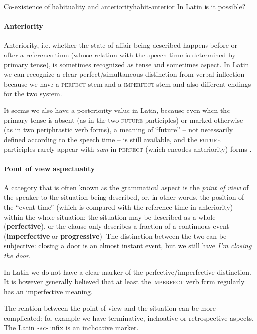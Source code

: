\documentclass[a4paper, oneside, 12pt]{report}
\newcommand*{\citetable}[1]{Table~{#1}}
\newcommand*{\concept}[1]{\textbf{#1}}
\newcommand{\form}[1]{\emph{#1}}
\newcommand*{\category}[1]{\textsc{#1}}
\begin{document}
\begin{todobox}{Co-existence of habituality and anteriority}{habit-anterior}
In Latin is it possible?
\end{todobox}

\paragraph*{Anteriority}
Anteriority, i.e. whether the state of affair being described
happens before or after a reference time 
(whose relation with the speech time is determined by primary tense),
is sometimes recognized as tense and sometimes aspect.
In Latin we can recognize a clear perfect/simultaneous distinction from verbal inflection
because we have a \category{perfect} stem and a \category{imperfect} stem
and also different endings for the two system.

It seems we also have a posteriority value in Latin,
because even when the primary tense is absent 
(as in the two \category{future} participles)
or marked otherwise (as in two periphrastic verb forms),
a meaning of ``future'' -- not necessarily defined according to the speech time --
is still available,
and the \category{future} participles rarely appear
with \form{sum} in \category{perfect} (which encodes anteriority) forms
\citep[\citetable{7.3}]{Pinkster1}.

\paragraph*{Point of view aspectuality}
A category that is often known as the grammatical aspect 
is the \emph{point of view} of the speaker to the situation being described,
or, in other words, the position of the ``event time'' 
(which is compared with the reference time in anteriority)
within the whole situation:
the situation may be described as a whole (\concept{perfective}),
or the clause only describes a fraction of a continuous event 
(\concept{imperfective} or \concept{progressive}).
The distinction between the two can be subjective:
closing a door is an almost instant event,
but we still have \form{I'm closing the door}.

In Latin we do not have a clear marker of the perfective/imperfective distinction.
It is however generally believed that at least the \category{imperfect} verb form regularly has an imperfective meaning.

The relation between the point of view and the situation can be more complicated:
for example we have terminative, inchoative or retrospective aspects.
The Latin \form{-sc-} infix is an inchoative marker.
\end{document}
